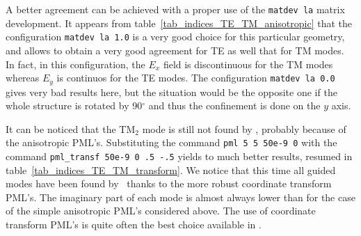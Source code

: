 A better agreement can be achieved with a proper use of the \lstinline!matdev la! matrix development. It appears from table~\ref{tab_indices_TE_TM_anisotropic} that the configuration \lstinline!matdev la 1.0! is a very good choice for this particular geometry, and allows to obtain a very good agreement for TE as well that for TM modes. In fact, in this configuration, the $E_x$ field is discontinuous for the TM modes whereas $E_y$ is continuos for the TE modes. The configuration \lstinline!matdev la 0.0! gives very bad results here, but the situation would be the opposite one if the whole structure is rotated by 90$^\circ$ and thus the confinement is done on the $y$ axis. 

It can be noticed that the TM$_2$ mode is still not found by \afmm , probably because of the anisotropic PML's. Substituting the command \lstinline!pml 5 5 50e-9 0! with the command \lstinline!pml_transf 50e-9 0 .5 -.5! yields to much better results, resumed in table~\ref{tab_indices_TE_TM_transform}. We notice that this time all guided modes have been found by \afmm\ thanks to the more robust coordinate transform PML's. The imaginary part of each mode is almost always lower than for the case of the simple anisotropic PML's considered above. 
The use of coordinate transform PML's is quite often the best choice available in \afmm .

